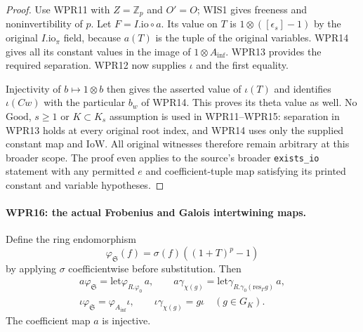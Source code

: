 \documentclass[11pt,a4paper]{article}
\numberwithin{equation}{section}
\theoremstyle{remark}\newtheorem{remark}[theorem]{Remark}
\begin{document}
\begin{proof}
Use WPR11 with $Z=\mathbb Z_p$ and $O'=O$; WIS1 gives
freeness and noninvertibility of $p$. Let $F=I.\mathrm{io}\circ a$.
Its value on $T$ is $1\otimes([\epsilon_s]-1)$ by the original
$I.\mathrm{io}_\pi$ field, because $a(T)$ is the tuple of
the original variables. WPR14 gives all its constant values in
the image of $1\otimes A_{\mathrm{inf}}$. WPR13 provides the required
separation. WPR12 now supplies $\iota$ and the first equality.

Injectivity of $b\mapsto1\otimes b$ then gives the asserted
value of $\iota(T)$ and identifies $\iota(Cw)$ with the
particular $b_w$ of WPR14. This proves its theta value as well.
No $\mathrm{Good}$, $s\geq1$ or $K\subset K_s$ assumption
is used in WPR11--WPR15: separation in WPR13 holds at every
original root index, and WPR14 uses only the supplied constant
map and $\mathrm{IoW}$. All original witnesses therefore remain
arbitrary at this broader scope. The proof even applies
to the source's broader \texttt{exists\_\allowbreak io} statement with any
permitted $e$ and coefficient-tuple map satisfying its printed
constant and variable hypotheses.
\end{proof}

\paragraph{WPR16: the actual Frobenius and Galois intertwining maps.}
\label{claim:WPR16}
Define the ring endomorphism
\[
 \varphi_{\mathfrak S}(f)
       =\sigma(f)((1+T)^p-1)
\]
by applying $\sigma$ coefficientwise before substitution. Then
\[
 \begin{gathered}
 a\varphi_{\mathfrak S}=\mathrm{let}\varphi_{R.\varphi_0}\,a,
 \qquad a\gamma_{\chi(g)}
       =\mathrm{let}\gamma_{R.\gamma_0(\mathrm{res}_\Gamma g)}\,a,\\
 \iota\varphi_{\mathfrak S}=\varphi_{A_{\mathrm{inf}}}\iota,
 \qquad \iota\gamma_{\chi(g)}=g\iota
                                \quad(g\in G_K).
 \end{gathered}                                                     \tag{WPR.18}
\]
The coefficient map $a$ is injective.
\end{document}
